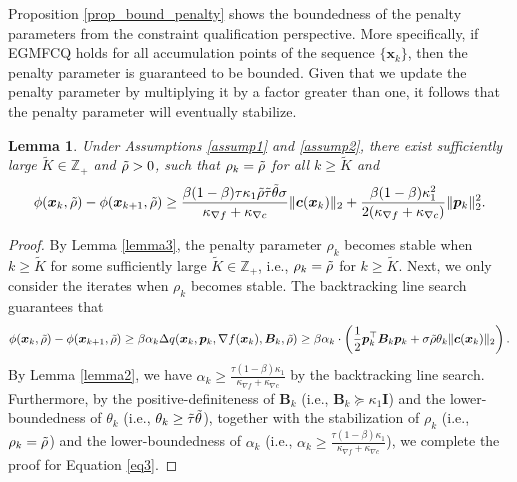 \documentclass[aos]{imsart}
\numberwithin{equation}{section}
\theoremstyle{plain}
\newtheorem{lemma}{Lemma}
\begin{document}
\begin{appendix}
Proposition \ref{prop_bound_penalty} shows the boundedness of the penalty parameters from the constraint qualification perspective. More specifically, if EGMFCQ holds for all accumulation points of the sequence $\{\bm{x}_{k}\}$, then the penalty parameter is guaranteed to be bounded. Given that we update the penalty parameter by multiplying it by a factor greater than one, it follows that the penalty parameter will eventually stabilize.

 \begin{lemma}
 \label{lemma4}
     Under Assumptions \ref{assump1} and \ref{assump2}, there exist sufficiently large $\widetilde{K} \in \mathbb{Z}_{+}$ and $\Tilde{\rho}>0$, such that $\rho_k = \Tilde{\rho}$ for all $k \geq \widetilde{K}$ and 
     \begin{equation}
     \label{eq3}
         \phi(\bm{x}_{k},\Tilde{\rho}) - \phi(\bm{x}_{k+1},\Tilde{\rho}) \geq \frac{\beta (1-\beta) \tau\kappa_1 \Tilde{\rho} \Tilde{\tau} \Tilde{\theta} \sigma}{\kappa_{\nabla f}+\kappa_{\nabla c}} \|\bm{c}(\bm{x}_k)\|_2 + \frac{\beta (1-\beta)\kappa_1^2}{2(\kappa_{\nabla f}+\kappa_{\nabla c})} \|\bm{p}_k\|_2^2.
     \end{equation}
 \end{lemma}

 \begin{proof}
     By Lemma \ref{lemma3}, the penalty parameter $\rho_k$ becomes stable when $k \geq \widetilde{K}$ for some sufficiently large $\widetilde{K} \in \mathbb{Z}_{+}$, i.e., $\rho_k = \Tilde{\rho}$ for $k \geq \widetilde{K}$. Next, we only consider the iterates when $\rho_k$ becomes stable. The backtracking line search guarantees that
     \begin{equation*}
        \phi(\bm{x}_{k},\Tilde{\rho}) - \phi(\bm{x}_{k+1},\Tilde{\rho}) \geq  \beta \alpha_k \Delta q(\bm{x}_k,\bm{p}_k, \nabla f(\bm{x}_k),\bm{B}_k,\Tilde{\rho}) \geq \beta \alpha_k \cdot \left(\frac{1}{2} \bm{p}_k^{\top} \bm{B}_k \bm{p}_k + \sigma \Tilde{\rho} \theta_k \|\bm{c}(\bm{x}_k)\|_2\right).
     \end{equation*}
     By Lemma \ref{lemma2}, we have $\alpha_k \geq \frac{\tau (1-\beta)\kappa_1}{\kappa_{\nabla f}+\kappa_{\nabla c}}$ by the backtracking line search. Furthermore, by the positive-definiteness of $\bm{B}_k$ (i.e., $\bm{B}_k \succeq \kappa_1 \mathbf{I}$) and the lower-boundedness of $\theta_k$ (i.e., $\theta_k \geq \Tilde{\tau}\Tilde{\theta}$), together with the stabilization of $\rho_k$ (i.e., $\rho_k = \Tilde{\rho}$) and the lower-boundedness of $\alpha_k$ (i.e., $\alpha_k \geq \frac{\tau (1-\beta)\kappa_1}{\kappa_{\nabla f}+\kappa_{\nabla c}}$), we complete the proof for Equation \eqref{eq3}. 
 \end{proof}



\end{appendix}
\end{document}
